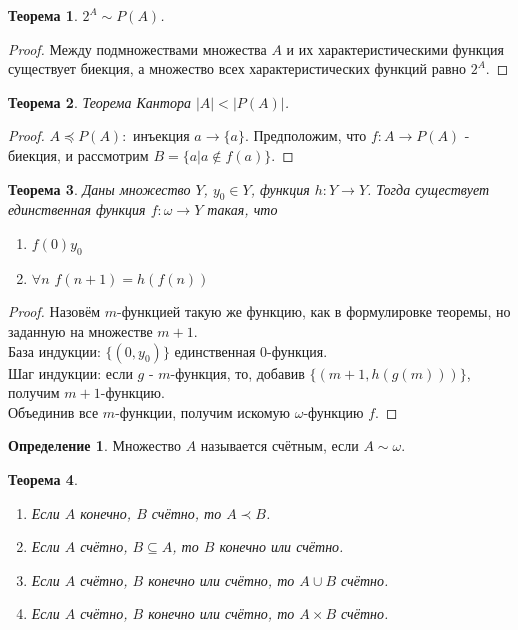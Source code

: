 \documentclass[a4paper, 12pt]{article}
\theoremstyle{definition}
\newtheorem*{definition}{Определение}
\theoremstyle{plain}
\newtheorem*{theorem}{Теорема}
\theoremstyle{remark}
\begin{document}
  \begin{theorem}
    $2^A\sim P(A)$.
  \end{theorem}
  \begin{proof}
    Между подмножествами множества $A$ и их характеристическими функция существует биекция, а множество всех характеристических функций равно $2^A$.
  \end{proof}
  \begin{theorem}{Теорема Кантора}
    $|A|<|P(A)|$.
  \end{theorem}
  \begin{proof}
    $A\preceq P(A):$ инъекция $a\to\{a\}$. Предположим, что $f:A\to P(A)$ - биекция, и рассмотрим $B=\{a|a\notin f(a)\}$.
  \end{proof}
  \begin{theorem}
    Даны множество $Y$, $y_0\in Y$, функция $h:Y\to Y$. Тогда существует единственная функция $f:\omega\to Y$ такая, что
    \begin{enumerate}
      \item $f(0)y_0$
      \item $\forall n$ $f(n+1)=h(f(n))$
    \end{enumerate} 
  \end{theorem}
  \begin{proof}
    Назовём $m$-функцией такую же функцию, как в формулировке теоремы, но заданную на множестве $m+1$.\\
    База индукции: $\{(0, y_0)\}$ единственная 0-функция.\\
    Шаг индукции: если $g$ - $m$-функция, то, добавив $\{(m+1,h(g(m)))\}$, получим $m+1$-функцию.\\Объединив все $m$-функции, получим искомую $\omega$-функцию $f$.
  \end{proof}
  \begin{definition}
    Множество $A$ называется счётным, если $A\sim\omega$.
  \end{definition}
  \begin{theorem}
    \begin{enumerate}
      \item Если $A$ конечно, $B$ счётно, то $A\prec B$.
      \item Если $A$ счётно, $B\subseteq A$, то $B$ конечно или счётно.
      \item Если $A$ счётно, $B$ конечно или счётно, то $A\cup B$ счётно.
      \item Если $A$ счётно, $B$ конечно или счётно, то $A\times B$ счётно.
    \end{enumerate}
  \end{theorem}
\end{document}

